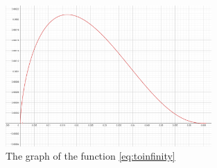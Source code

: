 \documentclass{article}
\theoremstyle{plain}
\theoremstyle{definition}
\begin{document}
	\printbibliography
	
	\newpage
	\appendix
	\begin{figure}
	    \centering
	    \includegraphics[width=0.7\textwidth]{img/limoff1.PNG}
	    \caption{The graph of the function \eqref{eq:toinfinity}}\label{fig:limoff1}
	\end{figure}
	
\end{document}
